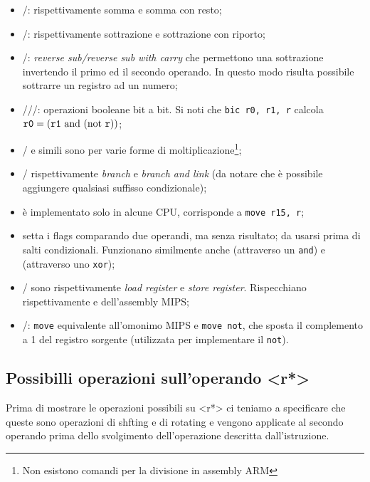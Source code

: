 \documentclass[class=book, crop=false, oneside]{standalone}
\begin{document}
\begin{itemize}
	\item {}/: rispettivamente somma e somma con resto;
	\item {}/: rispettivamente sottrazione e sottrazione con riporto;
	\item {}/: \emph{reverse sub/reverse sub with carry} che permettono una sottrazione invertendo il primo ed il secondo operando. In questo modo risulta possibile sottrarre un registro ad un numero;
	\item {}///: operazioni booleane bit a bit. Si noti che \texttt{bic r0, r1, r} calcola \(\texttt{r0} = (\texttt{r1} \textrm{ and } (\textrm{not } \texttt{r}))\);
	\item {}/ e simili sono per varie forme di moltiplicazione\footnote{Non esistono comandi per la divisione in assembly ARM};
	\item {}/ rispettivamente \emph{branch} e \emph{branch and link} (da notare che è possibile aggiungere qualsiasi suffisso condizionale);
	\item {} è implementato solo in alcune CPU, corrisponde a \texttt{move r15, r};
	\item {} setta i flags comparando due operandi, ma senza risultato; da usarsi prima di salti condizionali. Funzionano similmente anche  (attraverso un \texttt{and}) e  (attraverso uno \texttt{xor});
	\item {}/ sono rispettivamente \emph{load register} e \emph{store register}. Rispecchiano rispettivamente  e  dell'assembly MIPS;
	\item {}/: \texttt{move} equivalente all'omonimo MIPS e \texttt{move not}, che sposta il complemento a 1 del registro sorgente (utilizzata per implementare il \texttt{not}).
\end{itemize}
\subsection{Possibilli operazioni sull'operando <r*>}\label{sec:modifiche}
Prima di mostrare le operazioni possibili su <r*> ci teniamo a specificare che queste sono operazioni di shfting e di rotating e vengono applicate al secondo operando prima dello svolgimento dell'operazione descritta dall'istruzione.
\end{document}
